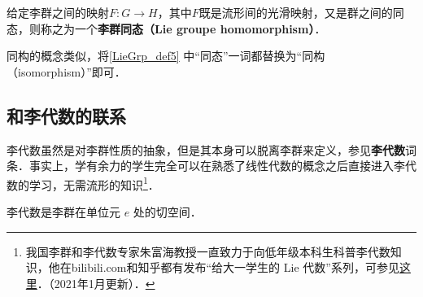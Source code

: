 \begin{definition}{}\label{LieGrp_def5}
给定李群之间的映射$F:G\to H$，其中$F$既是流形间的光滑映射，又是群之间的同态，则称之为一个\textbf{李群同态（Lie groupe homomorphism）}．
\end{definition}

同构的概念类似，将\autoref{LieGrp_def5} 中“同态”一词都替换为“同构（isomorphism）”即可．

\subsection{和李代数的联系}

李代数虽然是对李群性质的抽象，但是其本身可以脱离李群来定义，参见\textbf{李代数}词条．事实上，学有余力的学生完全可以在熟悉了线性代数的概念之后直接进入李代数的学习，无需流形的知识\footnote{我国李群和李代数专家朱富海教授一直致力于向低年级本科生科普李代数知识，他在bilibili.com和知乎都有发布“给大一学生的 Lie 代数”系列，可参见\href{https://space.bilibili.com/509086270?from=search&seid=2394735306274350134和https://zhuanlan.zhihu.com/p/161735986}{这里}．（2021年1月更新）．}．

李代数是李群在单位元 $e$ 处的切空间．




